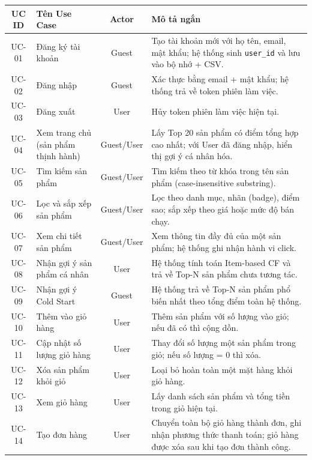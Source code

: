 \documentclass{report}
\begin{document}
\begin{table}[H]
    \centering
    \renewcommand{\arraystretch}{1.4}
    \begin{tabularx}{\textwidth}{|c|>{\raggedright\arraybackslash}p{4.5cm}|c|>{\raggedright\arraybackslash}X|}
        \hline
        \textbf{UC ID} & \textbf{Tên Use Case} & \textbf{Actor} & \textbf{Mô tả ngắn} \\ \hline
        UC-01 & Đăng ký tài khoản & Guest & Tạo tài khoản mới với họ tên, email, mật khẩu; hệ thống sinh \texttt{user\_id} và lưu vào bộ nhớ + CSV. \\ \hline
        UC-02 & Đăng nhập & Guest & Xác thực bằng email + mật khẩu; hệ thống trả về token phiên làm việc. \\ \hline
        UC-03 & Đăng xuất & User & Hủy token phiên làm việc hiện tại. \\ \hline
        UC-04 & Xem trang chủ (sản phẩm thịnh hành) & Guest/User & Lấy Top 20 sản phẩm có điểm tổng hợp cao nhất; với User đã đăng nhập, hiển thị gợi ý cá nhân hóa. \\ \hline
        UC-05 & Tìm kiếm sản phẩm & Guest/User & Tìm kiếm theo từ khóa trong tên sản phẩm (case-insensitive substring). \\ \hline
        UC-06 & Lọc và sắp xếp sản phẩm & Guest/User & Lọc theo danh mục, nhãn (badge), điểm sao; sắp xếp theo giá hoặc mức độ bán chạy. \\ \hline
        UC-07 & Xem chi tiết sản phẩm & Guest/User & Xem thông tin đầy đủ của một sản phẩm; hệ thống ghi nhận hành vi click. \\ \hline
        UC-08 & Nhận gợi ý sản phẩm cá nhân & User & Hệ thống tính toán Item-based CF và trả về Top-N sản phẩm chưa tương tác. \\ \hline
        UC-09 & Nhận gợi ý Cold Start & Guest & Hệ thống trả về Top-N sản phẩm phổ biến nhất theo tổng điểm toàn hệ thống. \\ \hline
        UC-10 & Thêm vào giỏ hàng & User & Thêm sản phẩm với số lượng vào giỏ; nếu đã có thì cộng dồn. \\ \hline
        UC-11 & Cập nhật số lượng giỏ hàng & User & Thay đổi số lượng một sản phẩm trong giỏ; nếu số lượng = 0 thì xóa. \\ \hline
        UC-12 & Xóa sản phẩm khỏi giỏ & User & Loại bỏ hoàn toàn một mặt hàng khỏi giỏ hàng. \\ \hline
        UC-13 & Xem giỏ hàng & User & Lấy danh sách sản phẩm và tổng tiền trong giỏ hiện tại. \\ \hline
        UC-14 & Tạo đơn hàng & User & Chuyển toàn bộ giỏ hàng thành đơn, ghi nhận phương thức thanh toán; giỏ hàng được xóa sau khi tạo đơn thành công. \\ \hline

\end{tabularx}
\end{table}
\end{document}
